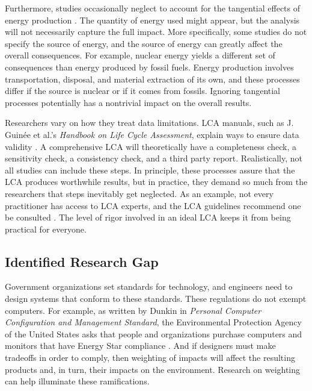 \documentclass[final,journal,10pt,letterpaper,oneside,twocolumn,compsoc]%
{IEEEtran}
\begin{document}
Furthermore, studies occasionally neglect to account for the tangential effects
of energy production \cite{maga}
\cite{client} \cite{desktop}. The quantity of energy used might appear, but
the analysis will not necessarily capture the full impact.
More specifically, some studies do not specify the source of energy, and the
source of energy can
greatly affect the overall consequences. For example, nuclear energy yields a
different set
of consequences than energy produced by fossil fuels. Energy production involves
transportation,
disposal, and material extraction of its own, and these processes differ if the
source is nuclear or if it comes from fossils. Ignoring tangential processes
potentially has a nontrivial impact on the overall results.

Researchers vary on how they treat data limitations. LCA manuals, such as J.
Guin\'{e}e et al.'s \textit{Handbook on Life Cycle Assessment}, explain
ways to ensure data validity \cite{lca} \cite{textbook}
\cite{14040} \cite{14044}. A comprehensive LCA will theoretically have a
completeness check, a sensitivity check, a consistency check, and a third party
report. Realistically, not all studies can include these steps. In
principle, these processes assure that the LCA produces worthwhile
results, but in practice, they demand so much from the researchers that
steps inevitably get neglected. As an example, not every practitioner has access
to LCA experts, and the LCA guidelines recommend one be
consulted \cite{14044}. The level of rigor involved in an ideal LCA
keeps it from being practical for everyone.

\subsection{Identified Research Gap}
Government organizations set standards for technology, and
engineers need to design systems that conform to these standards. These
regulations do not exempt computers. For example, as written by Dunkin in
\textit{Personal Computer Configuration and Management Standard}, the
Environmental Protection
Agency of the United States asks that people and organizations purchase
computers and monitors that have Energy Star
compliance \cite{epa}. And if designers must make
tradeoffs in order to comply, then weighting of impacts will affect
the resulting products and, in turn, their impacts on the environment.
Research on weighting can help illuminate these ramifications.
\end{document}
